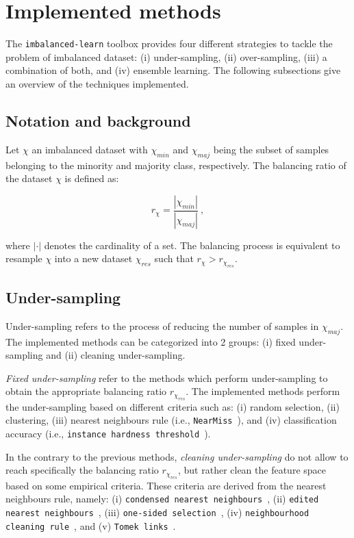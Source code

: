\documentclass[twoside,11pt]{article}
\begin{document}
\section{Implemented methods}

The \texttt{imbalanced-learn} toolbox provides four different strategies to tackle the problem of imbalanced dataset:
(i) under-sampling, (ii) over-sampling, (iii) a combination of both, and (iv) ensemble learning.
The following subsections give an overview of the techniques implemented.

\subsection{Notation and background}

Let $\chi$ an imbalanced dataset with $\chi_{min}$ and $\chi_{maj}$ being the subset of samples belonging to the minority and majority class, respectively.
The balancing ratio of the dataset $\chi$ is defined as:

\begin{equation}
r_{\chi} = \frac{|\chi_{min}|}{|\chi_{maj}|} \ ,
\end{equation}

\noindent where $|\cdot|$ denotes the cardinality of a set. The balancing process is equivalent to resample $\chi$ into a new dataset $\chi_{res}$ such that $r_{\chi} > r_{\chi_{res}}$.

\subsection{Under-sampling}

Under-sampling refers to the process of reducing the number of samples in $\chi_{maj}$.
The implemented methods can be categorized into 2 groups: (i) fixed under-sampling and (ii) cleaning under-sampling.

\emph{Fixed under-sampling} refer to the methods which perform under-sampling to obtain the appropriate balancing ratio $r_{\chi_{res}}$.
The implemented methods perform the under-sampling based on different criteria such as: (i) random selection, (ii) clustering, (iii) nearest neighbours rule (i.e., \texttt{NearMiss}~\citep{mani2003knn}), and (iv) classification accuracy (i.e., \texttt{instance hardness threshold}~\citep{smith2014instance}).

In the contrary to the previous methods, \emph{cleaning under-sampling} do not allow to reach specifically the balancing ratio $r_{\chi_{res}}$, but rather clean the feature space based on some empirical criteria.
These criteria are derived from the nearest neighbours rule, namely: (i) \texttt{condensed nearest neighbours}~\citep{hart1968condensed}, (ii) \texttt{edited nearest neighbours}~\citep{wilson1972asymptotic}, (iii) \texttt{one-sided selection}~\citep{kubat1997addressing}, (iv) \texttt{neighbourhood cleaning rule}~\citep{laurikkala2001improving}, and (v) \texttt{Tomek links}~\citep{tomek1976two}.
\end{document}
